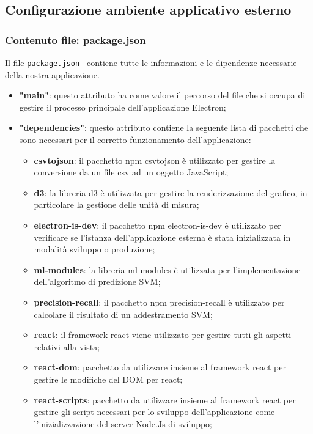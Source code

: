 \subsection{Configurazione ambiente applicativo esterno}
\subsubsection{Contenuto file: package.json}
Il file \verb|package.json | contiene tutte le informazioni e le dipendenze necessarie della nostra applicazione.
\begin{itemize}
    \item \textbf{"main"}: questo attributo ha come valore il percorso del file che si occupa di gestire il processo principale dell'applicazione Electron;
    \item \textbf{"dependencies"}: questo attributo contiene la seguente lista di pacchetti che sono necessari per il corretto funzionamento dell'applicazione:
        \begin{itemize}
            \item \textbf{csvtojson}: il pacchetto npm csvtojson è utilizzato per gestire la conversione da un file csv ad un oggetto JavaScript;
            \item \textbf{d3}: la libreria d3 è utilizzata per gestire la renderizzazione del grafico, in particolare la gestione delle unità di misura;
            \item \textbf{electron-is-dev}: il pacchetto npm electron-is-dev è utilizzato per verificare se l'istanza dell'applicazione esterna è stata inizializzata in modalità sviluppo o produzione;
            \item \textbf{ml-modules}: la libreria ml-modules è utilizzata per l'implementazione dell'algoritmo di predizione SVM\glo;
            \item \textbf{precision-recall}: il pacchetto npm precision-recall è utilizzato per calcolare il risultato di un addestramento SVM\glo;
            \item \textbf{react}: il framework react viene utilizzato per gestire tutti gli aspetti relativi alla vista;
            \item \textbf{react-dom}: pacchetto da utilizzare insieme al framework react per gestire le modifiche del DOM per react;
            \item \textbf{react-scripts}: pacchetto da utilizzare insieme al framework react per gestire gli script necessari per lo sviluppo dell'applicazione come l'inizializzazione del server Node.Js di sviluppo;

\end{itemize}
\end{itemize}
